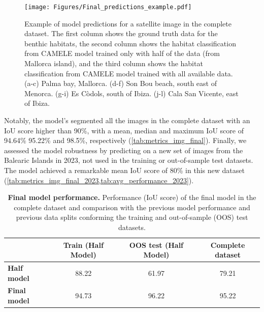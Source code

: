 \begin{figure}[H]
    \centering
    \texttt{[image: Figures/Final\_predictions\_example.pdf]}
    \caption[Example of model predictions for a satellite image in the complete
        dataset]{Example of model predictions for a satellite image in the
        complete
        dataset. The first column shows the ground truth data for the benthic
        habitats, the second column shows the habitat classification from
        CAMELE model trained only with half of the data (from Mallorca island),
        and the third column shows the habitat classification from CAMELE model
        trained with all available data. (a-c) Palma bay, Mallorca. (d-f) Son
        Bou beach, south east of Menorca. (g-i) Es Còdols, south of Ibiza.
        (j-l) Cala San Vicente, east of Ibiza.}
    \label{fig:model_performance_complete}
\end{figure}

Notably, the model's
segmented all the images in the complete dataset with an IoU score higher than
90\%, with a mean, median and maximum IoU score of 94.64\% 95.22\% and 98.5\%,
respectively (\cref{tab:metrics_img_final}). Finally, we assessed the model
robustness by predicting on a new set of images from the Balearic Islands in
2023, not used in the training or out-of-sample test datasets. The model
achieved a remarkable mean IoU score of 80\% in this new dataset
(\cref{tab:metrics_img_final_2023,tab:avg_performance_2023}).

\begin{table}[H]
    \centering
    \caption[Final model performance]{\textbf{Final model performance.}
        Performance (IoU score) of the final model in the complete dataset
        and
        comparison with the previous model performance and previous data splits
        conforming the training and out-of-sample (OOS) test datasets.}
    \label{tab:my-table}
    \begin{tabular}{lccc}
        \hline
                                       & \textbf{Train (Half Model)}
                                       &
        \textbf{OOS test (Half Model)} &
        \textbf{Complete
            dataset}
        \\
        \hline
        \textbf{Half model}            & 88.22
                                       & 61.97                       &
        79.21
        \\
        \textbf{Final model}           & 94.73
                                       & 96.22                       &
        95.22
        \\\hline
    \end{tabular}
\end{table}

